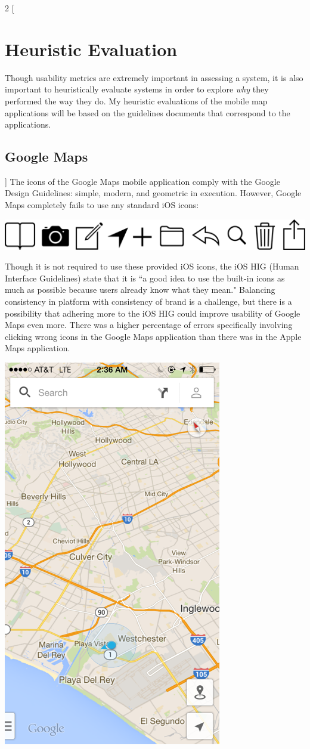 \documentclass[a4paper; 11pt]{article}
\begin{document}
\begin{multicols}{2}
[
\section{Heuristic Evaluation}
Though usability metrics are extremely important in assessing a system, it is also important to heuristically evaluate systems in order to explore \textit{why} they performed the way they do.
My heuristic evaluations of the mobile map applications will be based on the guidelines documents that correspond to the applications.
\subsection{Google Maps}
]
The icons of the Google Maps mobile application comply with the Google Design Guidelines\cite{Google}: simple, modern, and geometric in execution. However, Google Maps completely fails to use any standard iOS icons\cite{Apple}:
\par
\noindent
\includegraphics[width=.45\textwidth]{ios-bar-icons.png}
\par
\noindent
Though it is not required to use these provided iOS icons, the iOS HIG (Human Interface Guidelines) state that it is ``a good idea to use the built-in icons as much as possible because users already know what they mean."\cite{Apple} Balancing consistency in platform with consistency of brand is a challenge, but there is a possibility that adhering more to the iOS HIG could improve usability of Google Maps even more. There was a higher percentage of errors specifically involving clicking wrong icons in the Google Maps application than there was in the Apple Maps application. 

\includegraphics[width=.5\textwidth]{google-maps.png}


\end{multicols}
\end{document}

